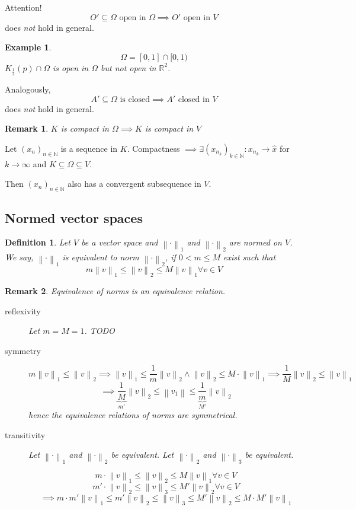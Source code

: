 \documentclass{article}
\newtheorem{example}{Example}  \numberwithin{example}{section}
\newtheorem{definition}{Definition}  \numberwithin{definition}{section}
\newtheorem{remark}{Remark}  \numberwithin{remark}{section}
\newcommand{\norm}[1]{\left\|#1\right\|}
\begin{document}
Attention!
\[ O' \subseteq \Omega \text{ open in } \Omega \implies O' \text{ open in } V \]
does \emph{not} hold in general.

\begin{example}
  \[ \Omega = [0,1] \cap [0,1) \]
  $K_{\frac12}(p) \cap \Omega$ is open in $\Omega$ but not open in $\mathbb R^2$.
\end{example}

Analogously,
\[ A' \subseteq \Omega \text{ is closed} \implies A' \text{ closed in } V \]
does \emph{not} hold in general.

\begin{remark}
  $K$ is compact in $\Omega \implies K$ is compact in $V$
\end{remark}

Let $(x_n)_{n \in \mathbb N}$ is a sequence in $K$.
Compactness $\implies \exists (x_{n_k})_{k \in \mathbb N}: x_{n_k} \to \hat{x}$ for $k \to \infty$ and $K \subseteq \Omega \subseteq V$.

Then $(x_n)_{n \in \mathbb N}$ also has a convergent subsequence in $V$.

\subsection{Normed vector spaces}

\begin{definition} %
  Let $V$ be a vector space and $\norm{\cdot}_1$ and $\norm{\cdot}_2$ are normed on $V$.
  We say, $\norm{\cdot}_1$ is equivalent to norm $\norm{\cdot}_2$, if $0 < m \leq M$ exist such that
  \[ m \norm{v}_1 \leq \norm{v}_2 \leq M \norm{v}_1 \forall v \in V \]
\end{definition}

\begin{remark}
  Equivalence of norms is an equivalence relation.
  \begin{description}
    \item[reflexivity]
      Let $m = M = 1$. TODO
    \item[symmetry]
      \[ m \norm{v}_1 \leq \norm{v}_2 \implies \norm{v}_1 \leq \frac1m \norm{v}_2 \land \norm{v}_2 \leq M \cdot \norm{v}_1 \implies \frac1M \norm{v}_2 \leq \norm{v}_1 \]
      \[ \implies \underbrace{\frac1M}_{m'} \norm{v}_2 \leq \norm{v_1} \leq \underbrace{\frac1m}_{M'} \norm{v}_2 \]
      hence the equivalence relations of norms are symmetrical.
    \item[transitivity]
      Let $\norm{\cdot}_1$ and $\norm{\cdot}_2$ be equivalent.
      Let $\norm{\cdot}_2$ and $\norm{\cdot}_3$ be equivalent.

      \[ m \cdot \norm{v}_1 \leq \norm{v}_2 \leq M \norm{v}_1 \forall v \in V \]
      \[ m' \cdot \norm{v}_2 \leq \norm{v}_3 \leq M' \norm{v}_2 \forall v \in V \]
      \[ \implies m \cdot m' \norm{v}_1 \leq m' \norm{v}_2 \leq \norm{v}_3 \leq M' \norm{v}_2 \leq M \cdot M' \norm{v}_1 \]
  \end{description}
\end{remark}
\end{document}
